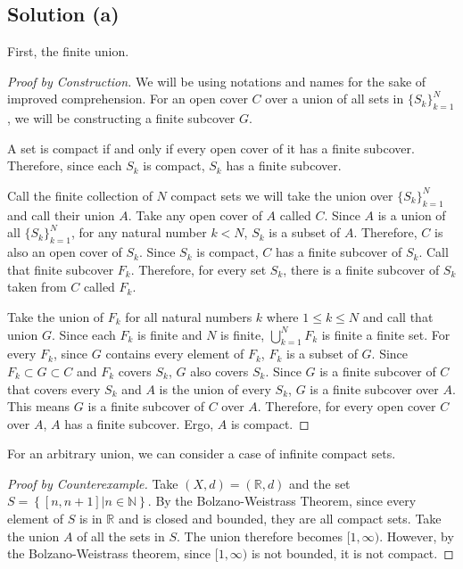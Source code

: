 \documentclass[11pt]{article}
\begin{document}
    \subsection{Solution (a)}
        First, the finite union.
        \begin{proof}[Proof by Construction]
            We will be using notations and names for the sake of improved comprehension.
            For an open cover $C$ over a union of all sets in $\{S_k\}_{k=1}^N$, we will be constructing a finite subcover $G$.

            A set is compact if and only if every open cover of it has a finite subcover.
            Therefore, since each $S_k$ is compact, $S_k$ has a finite subcover.

            Call the finite collection of $N$ compact sets we will take the union over $\{S_k\}_{k=1}^N$ and call their union $A$.
            Take any open cover of $A$ called $C$.
            Since $A$ is a union of all $\{S_k\}_{k=1}^N$, for any natural number $k < N$, $S_k$ is a subset of $A$.
            Therefore, $C$ is also an open cover of $S_k$.
            Since $S_k$ is compact, $C$ has a finite subcover of $S_k$.
            Call that finite subcover $F_k$.
            Therefore, for every set $S_k$, there is a finite subcover of $S_k$ taken from $C$ called $F_k$.

            Take the union of $F_k$ for all natural numbers $k$ where $1 \leq k \leq N$ and call that union $G$.
            Since each $F_k$ is finite and $N$ is finite, $\bigcup_{k = 1}^{N} F_k$ is finite a finite set.
            For every $F_k$, since $G$ contains every element of $F_k$, $F_k$ is a subset of $G$.
            Since $F_k \subset G \subset C$ and $F_k$ covers $S_k$, $G$ also covers $S_k$.
            Since $G$ is a finite subcover of $C$ that covers every $S_k$ and $A$ is the union of every $S_k$, $G$ is a finite subcover over $A$.
            This means $G$ is a finite subcover of $C$ over $A$.
            Therefore, for every open cover $C$ over $A$, $A$ has a finite subcover.
            Ergo, $A$ is compact.
        \end{proof}

        For an arbitrary union, we can consider a case of infinite compact sets.
        \begin{proof}[Proof by Counterexample]
            Take $(X,d) = (\mathbb{R},d)$ and the set $S = \left\{ [n,n+1] \Big| n \in \mathbb{N} \right\}$.
            By the Bolzano-Weistrass Theorem, since every element of $S$ is in $\mathbb{R}$ and is closed and bounded, they are all compact sets.
            Take the union $A$ of all the sets in $S$.
            The union therefore becomes $[1,\infty)$.
            However, by the Bolzano-Weistrass theorem, since $[1,\infty)$ is not bounded, it is not compact.
        \end{proof}
\end{document}
